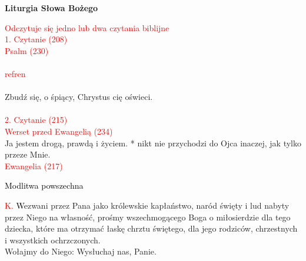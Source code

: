\documentclass[11pt, a5paper]{extarticle}
\begin{document}
\newpage

\begin{center}
\Large
\textbf{Liturgia Słowa Bożego} \\

\normalsize
\end{center}
\textcolor{red}{Odczytuje się jedno lub dwa czytania biblijne} \\
\textcolor{red}{1. Czytanie (208)} \\
\textcolor{red}{Psalm (230)} \\ \\
\textcolor{red}{refren} \\ \\
Zbudź się, o śpiący, Chrystus cię oświeci. \\ \\
\textcolor{red}{2. Czytanie (215)} \\
\textcolor{red}{Werset przed Ewangelią (234)} \\
Ja jestem drogą, prawdą i życiem. * nikt nie przychodzi do Ojca inaczej, jak tylko przeze Mnie. \\
\textcolor{red}{Ewangelia (217)}
\begin{center}
\Large
\noindent\textcolor{black}{Modlitwa powszechna}
\end{center}
\textcolor{red}{K.} \textcolor{black}Wezwani przez Pana jako królewskie kapłaństwo, naród święty i lud nabyty przez Niego na własność, prośmy wszechmogącego Boga o miłosierdzie dla tego dziecka, które ma otrzymać łaskę chrztu świętego, dla jego rodziców, chrzestnych i wszystkich ochrzczonych. \\
Wołajmy do Niego: Wysłuchaj nas, Panie.
\end{document}
